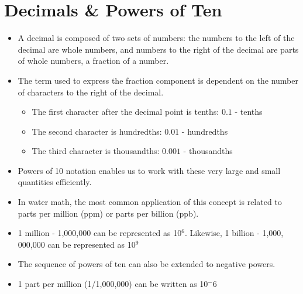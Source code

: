 \section{Decimals \& Powers of Ten}
\begin{itemize}
\item A decimal is composed of two sets of numbers: the numbers to the left of the decimal are whole numbers, and numbers to the right of the decimal are parts of whole numbers, a fraction of a number.\\

\item The term used to express the fraction component is dependent on the number of characters to the right of the decimal.

\begin{itemize}
  \item The first character after the decimal point is tenths: $0.1$ - tenths

  \item The second character is hundredths: $0.01$ - hundredths

  \item The third character is thousandths: $0.001$ - thousandths
\end{itemize}

\item Powers of 10 notation enables us to work with these very large and small quantities efficiently.
\item In water math, the most common application of this concept is related to parts per million (ppm) or parts per billion (ppb).
\item 1 million - 1,000,000 can be represented as 10$^6$.  Likewise, 1 billion - 1,000, 000,000 can be represented as 10$^9$
\item The sequence of powers of ten can also be extended to negative powers.
\item 1 part per million (1/1,000,000) can be written as 10$^-6$
\end{itemize}



